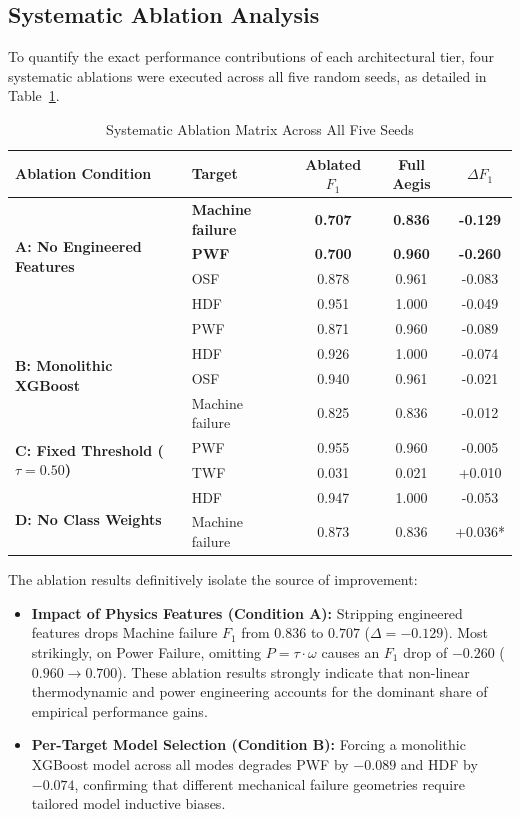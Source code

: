 \documentclass[conference]{IEEEtran}
\begin{document}
\begin{itemize}
\subsection{Systematic Ablation Analysis}
To quantify the exact performance contributions of each architectural tier, four systematic ablations were executed across all five random seeds, as detailed in Table~\ref{tab:ablation}.

\begin{table}[h]
\caption{Systematic Ablation Matrix Across All Five Seeds}
\centering
\begin{tabular}{llccc}
\toprule
\textbf{Ablation Condition} & \textbf{Target} & \textbf{Ablated $F_1$} & \textbf{Full Aegis} & \textbf{$\Delta F_1$} \\
\midrule
\multirow{4}{*}{\textbf{A: No Engineered Features}} & \textbf{Machine failure} & \textbf{0.707} & \textbf{0.836} & \textbf{-0.129} \\
 & \textbf{PWF} & \textbf{0.700} & \textbf{0.960} & \textbf{-0.260} \\
 & OSF & 0.878 & 0.961 & -0.083 \\
 & HDF & 0.951 & 1.000 & -0.049 \\
\midrule
\multirow{4}{*}{\textbf{B: Monolithic XGBoost}} & PWF & 0.871 & 0.960 & -0.089 \\
 & HDF & 0.926 & 1.000 & -0.074 \\
 & OSF & 0.940 & 0.961 & -0.021 \\
 & Machine failure & 0.825 & 0.836 & -0.012 \\
\midrule
\multirow{2}{*}{\textbf{C: Fixed Threshold ($\tau = 0.50$)}} & PWF & 0.955 & 0.960 & -0.005 \\
 & TWF & 0.031 & 0.021 & +0.010 \\
\midrule
\multirow{2}{*}{\textbf{D: No Class Weights}} & HDF & 0.947 & 1.000 & -0.053 \\
 & Machine failure & 0.873 & 0.836 & +0.036* \\
\bottomrule
\end{tabular}
\label{tab:ablation}
\end{table}

The ablation results definitively isolate the source of improvement:
\begin{itemize}
    \item \textbf{Impact of Physics Features (Condition A):} Stripping engineered features drops Machine failure $F_1$ from $0.836$ to $0.707$ ($\Delta = -0.129$). Most strikingly, on Power Failure, omitting $P = \tau \cdot \omega$ causes an $F_1$ drop of $\mathbf{-0.260}$ ($0.960 \rightarrow 0.700$). These ablation results strongly indicate that non-linear thermodynamic and power engineering accounts for the dominant share of empirical performance gains.
    \item \textbf{Per-Target Model Selection (Condition B):} Forcing a monolithic XGBoost model across all modes degrades PWF by $-0.089$ and HDF by $-0.074$, confirming that different mechanical failure geometries require tailored model inductive biases.
\end{itemize}


\end{itemize}
\end{document}
